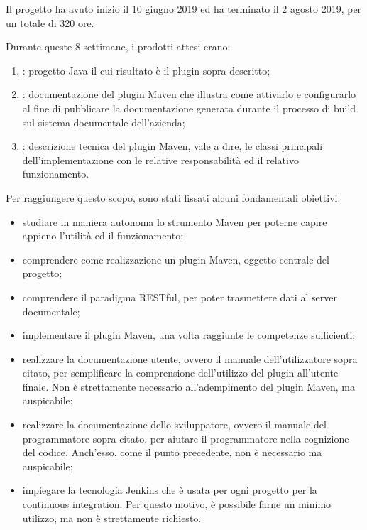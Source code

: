     
    Il progetto ha avuto inizio il 10 giugno 2019 ed ha terminato il 2 agosto 2019, per un totale di 320 ore.

    Durante queste 8 settimane, i prodotti attesi erano:
    \begin{enumerate}
        \item {}: progetto Java il cui risultato è il plugin sopra descritto;
        \item {}: documentazione del plugin Maven che illustra come attivarlo e configurarlo al fine di pubblicare la documentazione generata durante il processo di build sul sistema documentale dell’azienda;
        \item {}: descrizione tecnica del plugin Maven, vale a dire, le classi principali dell’implementazione con le relative responsabilità ed il relativo funzionamento.
    \end{enumerate}

    Per raggiungere questo scopo, sono stati fissati alcuni fondamentali obiettivi:
    \begin{itemize}
        \item studiare in maniera autonoma lo strumento Maven per poterne capire appieno l'utilità ed il funzionamento;
        \item comprendere come realizzazione un plugin Maven, oggetto centrale del progetto;
        \item comprendere il paradigma RESTful, per poter trasmettere dati al server documentale;
        \item implementare il plugin Maven, una volta raggiunte le competenze sufficienti;
        \item realizzare la documentazione utente, ovvero il manuale dell'utilizzatore sopra citato, per semplificare la comprensione dell'utilizzo del plugin all'utente finale. Non è strettamente necessario all'adempimento del plugin Maven, ma auspicabile;
        \item realizzare la documentazione dello sviluppatore, ovvero il manuale del programmatore sopra citato, per aiutare il programmatore nella cognizione del codice. Anch'esso, come il punto precedente, non è necessario ma auspicabile;
        \item impiegare la tecnologia Jenkins che è usata per ogni progetto per la continuous integration. Per questo motivo, è possibile farne un minimo utilizzo, ma non è strettamente richiesto.
    \end{itemize}
    
